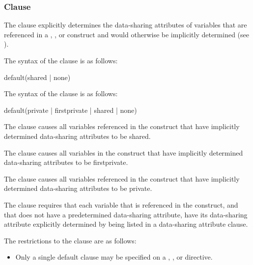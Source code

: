 \subsubsection{ Clause}
\label{subsubsec:default clause}
\summary
The  clause explicitly determines the data-sharing attributes of variables that 
are referenced in a , ,  or  construct
and would otherwise be implicitly determined (see
).

\syntax
\ccppspecificstart
The syntax of the  clause is as follows:

\begin{boxedcode}
default(shared \textnormal{|} none)
\end{boxedcode}
\ccppspecificend

\fortranspecificstart
The syntax of the  clause is as follows:

\begin{boxedcode}
default(private \textnormal{|} firstprivate \textnormal{|} shared \textnormal{|} none)
\end{boxedcode}
\fortranspecificend

\descr
The  clause causes all variables referenced in the construct that 
have implicitly determined data-sharing attributes to be shared.

\fortranspecificstart
The  clause causes all variables in the construct that have 
implicitly determined data-sharing attributes to be firstprivate.

The  clause causes all variables referenced in the construct that 
have implicitly determined data-sharing attributes to be private.
\fortranspecificend

The  clause requires that each variable that is referenced in the 
construct, and that does not have a predetermined data-sharing attribute, have its 
data-sharing attribute explicitly determined by being listed in a data-sharing attribute 
clause. 

\restrictions
The restrictions to the  clause are as follows:

\begin{itemize}
\item Only a single default clause may be specified on a , ,
 or  directive.
\end{itemize}









